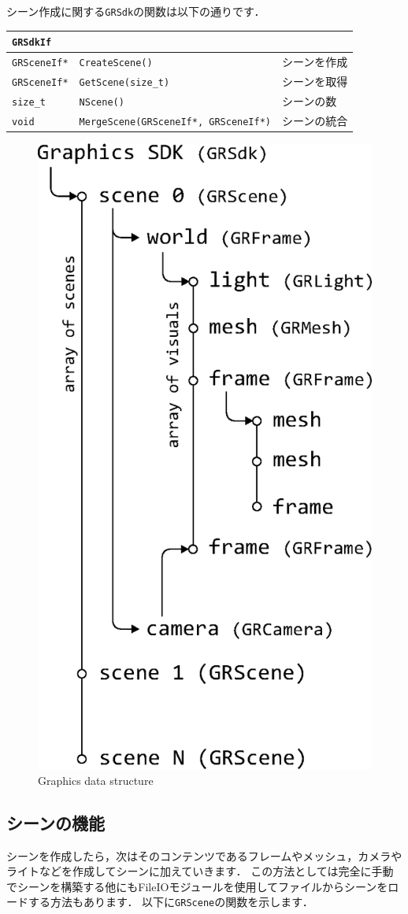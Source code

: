 \KLUDGE シーン作成に関する\texttt{GRSdk}\KLUDGE の関数は以下の通りです．

\begin{center}
\begin{tabular}{p{.15\hsize}p{.50\hsize}p{.25\hsize}}
\texttt{GRSdkIf}	&												&	\\ \midrule
\texttt{GRSceneIf*}	& \texttt{CreateScene()}						& \KLUDGE シーンを作成			\\
\texttt{GRSceneIf*}	& \texttt{GetScene(size\_t)}					& \KLUDGE シーンを取得			\\
\texttt{size\_t}	& \texttt{NScene()}								& \KLUDGE シーンの数			\\
\texttt{void}		& \texttt{MergeScene(GRSceneIf*, GRSceneIf*)}	& \KLUDGE シーンの統合			\\
\end{tabular}
\end{center}

\begin{figure}[t]
\begin{center}
\includegraphics[width=.4\hsize]{fig/grscene.eps}
\end{center}
\caption{Graphics data structure}
\label{fig_grscene}
\end{figure}

\subsection*{\KLUDGE シーンの機能}

\KLUDGE シーンを作成したら，次はそのコンテンツであるフレームやメッシュ，カメラやライトなどを作成してシーンに加えていきます．
\KLUDGE この方法としては完全に手動でシーンを構築する他にもFileIO\KLUDGE モジュールを使用してファイルからシーンをロードする方法もあります．
\KLUDGE 以下に\texttt{GRScene}\KLUDGE の関数を示します．

